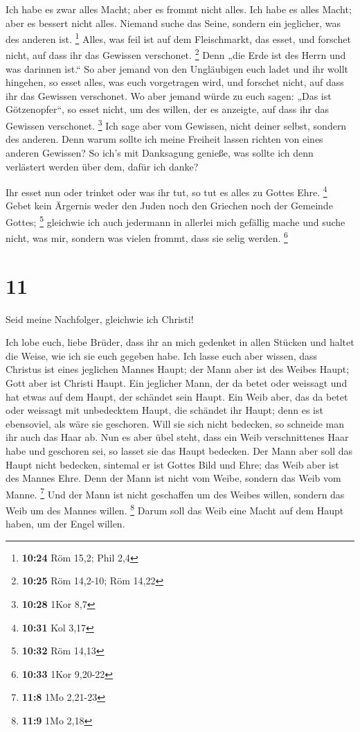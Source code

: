  Ich habe es zwar alles Macht; aber es frommt nicht alles.
Ich habe es alles Macht; aber es bessert nicht alles. 
Niemand suche das Seine, sondern ein jeglicher, was des anderen ist.
\footnote{\textbf{10:24} Röm 15,2; Phil 2,4}  Alles, was
feil ist auf dem Fleischmarkt, das esset, und forschet nicht, auf dass
ihr das Gewissen verschonet. \footnote{\textbf{10:25} Röm 14,2-10; Röm
  14,22}  Denn „die Erde ist des Herrn und was darinnen
ist.``  So aber jemand von den Ungläubigen euch ladet und
ihr wollt hingehen, so esset alles, was euch vorgetragen wird, und
forschet nicht, auf dass ihr das Gewissen verschonet.  Wo
aber jemand würde zu euch sagen: „Das ist Götzenopfer``, so esset nicht,
um des willen, der es anzeigte, auf dass ihr das Gewissen verschonet.
\footnote{\textbf{10:28} 1Kor 8,7}  Ich sage aber vom
Gewissen, nicht deiner selbst, sondern des anderen. Denn warum sollte
ich meine Freiheit lassen richten von eines anderen Gewissen?
 So ich's mit Danksagung genieße, was sollte ich denn
verlästert werden über dem, dafür ich danke?

 Ihr esset nun oder trinket oder was ihr tut, so tut es
alles zu Gottes Ehre. \footnote{\textbf{10:31} Kol 3,17} 
Gebet kein Ärgernis weder den Juden noch den Griechen noch der Gemeinde
Gottes; \footnote{\textbf{10:32} Röm 14,13}  gleichwie ich
auch jedermann in allerlei mich gefällig mache und suche nicht, was mir,
sondern was vielen frommt, dass sie selig werden. \footnote{\textbf{10:33}
  1Kor 9,20-22}

\hypertarget{section-6}{%
\section{11}\label{section-6}}

 Seid meine Nachfolger, gleichwie ich Christi!

 Ich lobe euch, liebe Brüder, dass ihr an mich gedenket in
allen Stücken und haltet die Weise, wie ich sie euch gegeben habe.
 Ich lasse euch aber wissen, dass Christus ist eines
jeglichen Mannes Haupt; der Mann aber ist des Weibes Haupt; Gott aber
ist Christi Haupt.  Ein jeglicher Mann, der da betet oder
weissagt und hat etwas auf dem Haupt, der schändet sein Haupt.
 Ein Weib aber, das da betet oder weissagt mit unbedecktem
Haupt, die schändet ihr Haupt; denn es ist ebensoviel, als wäre sie
geschoren.  Will sie sich nicht bedecken, so schneide man
ihr auch das Haar ab. Nun es aber übel steht, dass ein Weib
verschnittenes Haar habe und geschoren sei, so lasset sie das Haupt
bedecken.  Der Mann aber soll das Haupt nicht bedecken,
sintemal er ist Gottes Bild und Ehre; das Weib aber ist des Mannes Ehre.
 Denn der Mann ist nicht vom Weibe, sondern das Weib vom
Manne. \footnote{\textbf{11:8} 1Mo 2,21-23}  Und der Mann
ist nicht geschaffen um des Weibes willen, sondern das Weib um des
Mannes willen. \footnote{\textbf{11:9} 1Mo 2,18}  Darum
soll das Weib eine Macht auf dem Haupt haben, um der Engel willen.

